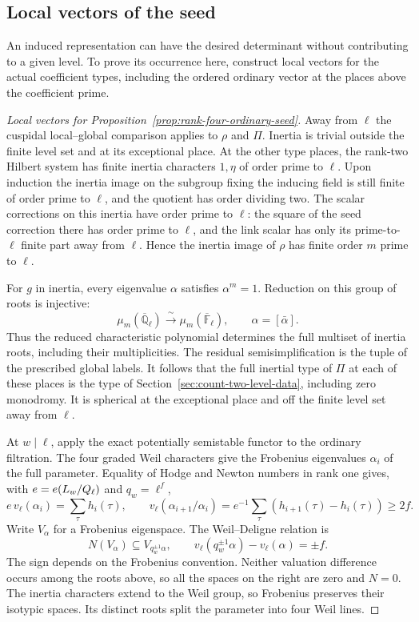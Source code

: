 \subsection{Local vectors of the seed}

An induced representation can have the desired determinant without contributing to a given level. To prove its occurrence here, construct local vectors for the actual coefficient types, including the ordered ordinary vector at the places above the coefficient prime.

\begin{proof}[Local vectors for Proposition~\ref{prop:rank-four-ordinary-seed}]
Away from \(\ell\) the cuspidal local--global comparison applies
to \(\rho\) and \(\Pi\). Inertia is trivial outside the finite
level set and at its exceptional place. At the other type
places, the rank-two Hilbert system has finite inertia
characters \(1,\eta\) of order prime to \(\ell\). Upon induction
the inertia image on the subgroup fixing the inducing field
is still finite of order prime to \(\ell\), and the quotient
has order dividing two. The scalar corrections on this inertia
have order prime to \(\ell\): the square of the seed correction
there has order prime to \(\ell\), and the link scalar has
only its prime-to-\(\ell\) finite part away from \(\ell\).
Hence the inertia image of \(\rho\) has finite order \(m\) prime
to \(\ell\).

For \(g\) in inertia, every eigenvalue \(\alpha\)
satisfies \(\alpha^m=1\). Reduction on this group of roots is injective:
\[
 \mu_m(\overline{\mathbb Q}_\ell)\xrightarrow{\;\sim\;}
 \mu_m(\overline{\mathbb F}_\ell),\qquad
 \alpha=[\bar\alpha].
\]
Thus the reduced characteristic polynomial determines the full multiset
of inertia roots, including their multiplicities. The residual
semisimplification is the tuple of the prescribed global
labels. It follows that the full inertial type of \(\Pi\)
at each of these places is the type of
Section~\ref{sec:count-two-level-data}, including zero monodromy.
It is spherical at the exceptional place and off the finite
level set away from \(\ell\).
\cite[Theorem 2.1.1]{blggt}

At \(w\mid\ell\), apply the exact potentially semistable
functor to the ordinary filtration. The four graded Weil
characters give the Frobenius eigenvalues \(\alpha_i\) of the
full parameter. Equality of Hodge and Newton numbers in rank
one gives, with \(e=e(L_w/Q_\ell)\) and \(q_w=\ell^f\),
\[
 e\,v_\ell(\alpha_i)=\sum_\tau h_i(\tau),\qquad
 v_\ell(\alpha_{i+1}/\alpha_i)
    =e^{-1}\sum_\tau(h_{i+1}(\tau)-h_i(\tau))\ge2f .
\]
Write \(V_\alpha\) for a Frobenius eigenspace. The
Weil--Deligne relation is
\[
 N(V_\alpha)\subseteq V_{q_w^{\pm1}\alpha},
 \qquad v_\ell(q_w^{\pm1}\alpha)-v_\ell(\alpha)=\pm f .
\]
The sign depends on the Frobenius convention. Neither valuation
difference occurs among the roots above, so all the spaces on
the right are zero and \(N=0\). The
inertia characters extend to the Weil group, so Frobenius
preserves their isotypic spaces. Its distinct roots split the
parameter into four Weil lines.


\end{proof}
